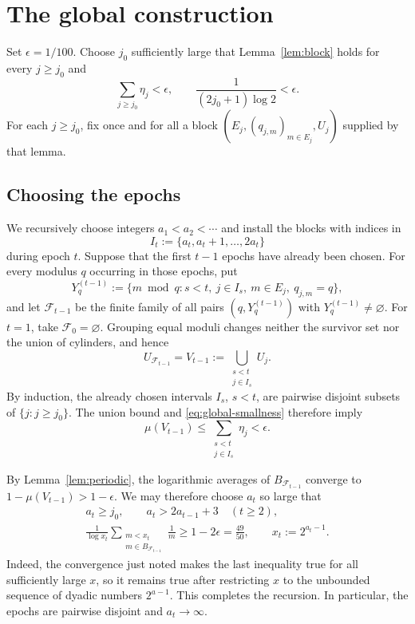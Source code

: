 \documentclass[11pt]{article}
\numberwithin{equation}{section}
\theoremstyle{definition}
\theoremstyle{remark}
\begin{document}
\section{The global construction}\label{sec:global}

Set \(\epsilon=1/100\).  Choose \(j_0\) sufficiently large that
Lemma~\ref{lem:block} holds for every \(j\ge j_0\) and
\begin{equation}\label{eq:global-smallness}
 \sum_{j\ge j_0}\eta_j<\epsilon,
 \qquad
 \frac1{(2j_0+1)\log2}<\epsilon.
\end{equation}
For each \(j\ge j_0\), fix once and for all a block
\((E_j,(q_{j,m})_{m\in E_j},U_j)\) supplied by that lemma.

\subsection{Choosing the epochs}

We recursively choose integers \(a_1<a_2<\cdots\) and install the blocks
with indices in
\[
 I_t:=\{a_t,a_t+1,\ldots,2a_t\}
\]
during epoch \(t\).  Suppose that the first \(t-1\) epochs have already
been chosen.  For every modulus \(q\) occurring in those epochs, put
\[
 Y_q^{(t-1)}
 :=\{m\bmod q:s<t,\ j\in I_s,\ m\in E_j,\ q_{j,m}=q\},
\]
and let \(\mathcal F_{t-1}\) be the finite family of all pairs
\((q,Y_q^{(t-1)})\) with \(Y_q^{(t-1)}\ne\varnothing\).  For \(t=1\),
take \(\mathcal F_0=\varnothing\).  Grouping equal moduli changes neither
the survivor set nor the union of cylinders, and hence
\[
 U_{\mathcal F_{t-1}}
 =V_{t-1}:=\bigcup_{\substack{s<t\\j\in I_s}}U_j.
\]
By induction, the already chosen intervals \(I_s\), \(s<t\), are pairwise
disjoint subsets of \(\{j:j\ge j_0\}\).  The union bound and
\eqref{eq:global-smallness} therefore imply
\[
 \mu(V_{t-1})
 \le\sum_{\substack{s<t\\j\in I_s}}\eta_j
 <\epsilon.
\]

By Lemma~\ref{lem:periodic}, the logarithmic averages of
\(B_{\mathcal F_{t-1}}\) converge to
\(1-\mu(V_{t-1})>1-\epsilon\).  We may therefore choose \(a_t\) so large
that
\begin{equation}\label{eq:epoch-choice}
\begin{gathered}
 a_t\ge j_0,\qquad
 a_t>2a_{t-1}+3\quad(t\ge2),\\
 \frac1{\log x_t}
 \sum_{\substack{m<x_t\\m\in B_{\mathcal F_{t-1}}}}\frac1m
 \ge1-2\epsilon=\frac{49}{50},
 \qquad x_t:=2^{a_t-1}.
\end{gathered}
\end{equation}
Indeed, the convergence just noted makes the last inequality true for all
sufficiently large \(x\), so it remains true after restricting \(x\) to
the unbounded sequence of dyadic numbers \(2^{a-1}\).  This completes the
recursion.  In particular, the epochs are pairwise disjoint and
\(a_t\to\infty\).
\end{document}

